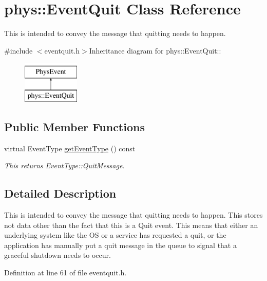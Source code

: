 \hypertarget{classphys_1_1EventQuit}{
\section{phys::EventQuit Class Reference}
\label{dd/dea/classphys_1_1EventQuit}
}


This is intended to convey the message that quitting needs to happen.  


{\ttfamily \#include $<$eventquit.h$>$}Inheritance diagram for phys::EventQuit::\begin{figure}[H]
\begin{center}
\leavevmode
\includegraphics[height=2cm]{dd/dea/classphys_1_1EventQuit}
\end{center}
\end{figure}
\subsection*{Public Member Functions}
\begin{DoxyCompactItemize}
\item 
virtual EventType \hyperlink{classphys_1_1EventQuit_a602a189d70441fdfaaae6aa29761ea43}{getEventType} () const 
\begin{DoxyCompactList}\small\item\em This returns EventType::QuitMessage. \item\end{DoxyCompactList}\end{DoxyCompactItemize}


\subsection{Detailed Description}
This is intended to convey the message that quitting needs to happen. This stores not data other than the fact that this is a Quit event. This means that either an underlying system like the OS or a service has requested a quit, or the application has manually put a quit message in the queue to signal that a graceful shutdown needs to occur. 

Definition at line 61 of file eventquit.h.

